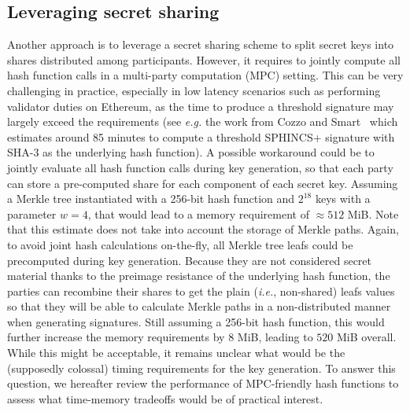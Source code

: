 \subsection{Leveraging secret sharing}
Another approach is to leverage a secret sharing scheme to split \WOTS secret keys into shares distributed among participants.
However, it requires to jointly compute all hash function calls in a multi-party computation (MPC) setting.
This can be very challenging in practice, especially in low latency scenarios such as performing validator duties on Ethereum, as the time to produce a threshold signature may largely exceed the requirements (see \textit{e.g.} the work from Cozzo and Smart~\cite{sharing_luov19} which estimates around 85 minutes to compute a threshold \textsf{SPHINCS+} signature with \textsf{SHA-3} as the underlying hash function).
A possible workaround could be to jointly evaluate all hash function calls during key generation, so that each party can store a pre-computed share for each component of each \WOTS secret key.
Assuming a Merkle tree instantiated with a 256-bit hash function and $2^{18}$ \WOTS keys with a parameter $w = 4$, that would lead to a memory requirement of $\approx 512$ MiB.
Note that this estimate does not take into account the storage of Merkle paths.
Again, to avoid joint hash calculations on-the-fly, all Merkle tree leafs could be precomputed during key generation.
Because they are not considered secret material thanks to the preimage resistance of the underlying hash function, the parties can recombine their shares to get the plain (\textit{i.e.}, non-shared) leafs values so that they will be able to calculate Merkle paths in a non-distributed manner when generating signatures.
Still assuming a 256-bit hash function, this would further increase the memory requirements by $8$ MiB, leading to $520$ MiB overall.
While this might be acceptable, it remains unclear what would be the (supposedly colossal) timing requirements for the key generation.
To answer this question, we hereafter review the performance of MPC-friendly hash functions to assess what time-memory tradeoffs would be of practical interest.



